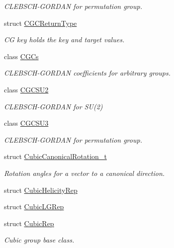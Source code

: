 \begin{DoxyCompactItemize}
\begin{DoxyCompactList}\small\item\em C\+L\+E\+B\+S\+C\+H-\/\+G\+O\+R\+D\+AN for permutation group. \end{DoxyCompactList}\item 
struct \mbox{\hyperlink{structHadron_1_1CGCReturnType}{C\+G\+C\+Return\+Type}}
\begin{DoxyCompactList}\small\item\em CG key holds the key and target values. \end{DoxyCompactList}\item 
class \mbox{\hyperlink{classHadron_1_1CGCs}{C\+G\+Cs}}
\begin{DoxyCompactList}\small\item\em C\+L\+E\+B\+S\+C\+H-\/\+G\+O\+R\+D\+AN coefficients for arbitrary groups. \end{DoxyCompactList}\item 
class \mbox{\hyperlink{classHadron_1_1CGCSU2}{C\+G\+C\+S\+U2}}
\begin{DoxyCompactList}\small\item\em C\+L\+E\+B\+S\+C\+H-\/\+G\+O\+R\+D\+AN for S\+U(2) \end{DoxyCompactList}\item 
class \mbox{\hyperlink{classHadron_1_1CGCSU3}{C\+G\+C\+S\+U3}}
\begin{DoxyCompactList}\small\item\em C\+L\+E\+B\+S\+C\+H-\/\+G\+O\+R\+D\+AN for permutation group. \end{DoxyCompactList}\item 
struct \mbox{\hyperlink{structHadron_1_1CubicCanonicalRotation__t}{Cubic\+Canonical\+Rotation\+\_\+t}}
\begin{DoxyCompactList}\small\item\em Rotation angles for a vector to a canonical direction. \end{DoxyCompactList}\item 
struct \mbox{\hyperlink{structHadron_1_1CubicHelicityRep}{Cubic\+Helicity\+Rep}}
\item 
struct \mbox{\hyperlink{structHadron_1_1CubicLGRep}{Cubic\+L\+G\+Rep}}
\item 
struct \mbox{\hyperlink{structHadron_1_1CubicRep}{Cubic\+Rep}}
\begin{DoxyCompactList}\small\item\em Cubic group base class. \end{DoxyCompactList}\item 

\end{DoxyCompactItemize}
